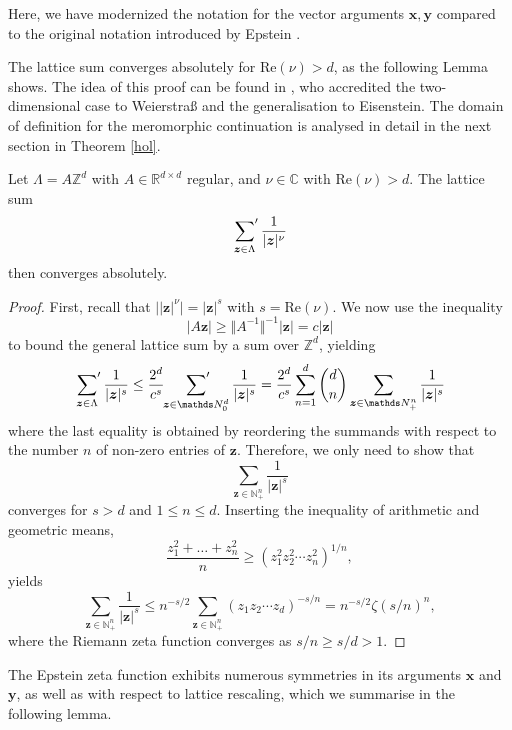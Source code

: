 \documentclass[]{amsart}
\newcommand{\new}[1]{#1}
\newcommand{\sums}{\sideset{}{'} \sum}
\numberwithin{mythm}{section}
\begin{document}
\new{Here, we have modernized the
notation for the vector arguments $\bm x,\bm y$
compared to the original notation introduced by Epstein \cite{epstein1903theorieI,epstein1903theorieII}.
}
The lattice sum converges absolutely for $\mathrm{Re}(\nu)>d$, as the following Lemma shows.
The idea of this proof can be found in \cite[Lemma 3.14]{Remmert}, who accredited the two-dimensional case to Weierstraß and the generalisation to Eisenstein. 
The domain of definition for the meromorphic continuation is analysed in detail in the next section in Theorem \ref{hol}.


\begin{lemma}
\label{lattice-sum-converges}
Let $\Lambda=A\mathds Z^d$ with $A\in \mathds R^{d\times d}$ regular, and $\nu \in \mathds C$ with $\mathrm{Re}(\nu)>d$. The lattice sum
\[\sums_{\bm z \in \Lambda} \frac{1}{\vert \bm z\vert^{\nu}}\]
then converges absolutely.
\end{lemma}
\begin{proof}
First, recall that  $\big||\bm z|^\nu \big| = |\bm z|^{s}$ with $s=\mathrm{Re}(\nu)$.
We now use the inequality 
\[\vert A\bm z\vert \ge  \Vert A^{-1} \Vert^{-1}  \vert \bm z\vert = c \vert \bm z\vert\]
 to bound the general lattice sum by a sum over $\mathds Z^d$, yielding
\[
\sums_{\bm z\in \Lambda}\frac{1}{\vert \bm z\vert^{s}}
\le 
\frac{2^d}{c^{s}}
\sums_{\bm z\in\mathds N_0^d}\frac{1}{\vert \bm z\vert^{s}}
=
\frac{2^d}{c^{s}}\sum_{n=1}^d\binom{d}{n}\sum_{\bm z\in\mathds N_+^n}\frac{1}{\vert \bm z\vert^{s}}
\]
where the last equality is obtained by reordering the summands with respect to the number $n$ of non-zero entries of $\bm z$.
Therefore, we only need to show that 
\[\sum_{\bm z\in\mathds N^n_+}\frac{1}{\vert \bm z\vert^{s}}\]
converges for \(s>d\) and \(1\le n\le d\).
Inserting the inequality of arithmetic and geometric means,
\[
\frac{z_1^2+\dots + z_n^2}{n} 
\geq (z_1^2 z_2^2\cdots z_n^2)^{1/n},
\]
yields
\[
\sum_{\bm z \in \mathds{N}^n_+} 
\frac{1}{\vert \bm z\vert^{s}} 
\leq
n^{-s/2}\sum_{\bm z \in \mathds{N}^n_+} (z_1 z_2\cdots z_d)^{-s/n}
=n^{-s/2}
\zeta(s/n)^n,
\]
where the Riemann zeta function converges as ${s/n\ge s/d >1}$.
\end{proof}



The Epstein zeta function exhibits numerous symmetries in its arguments $\bm{x}$ and $\bm{y}$, as well as with respect to lattice rescaling, which we summarise in the following lemma.
\end{document}
